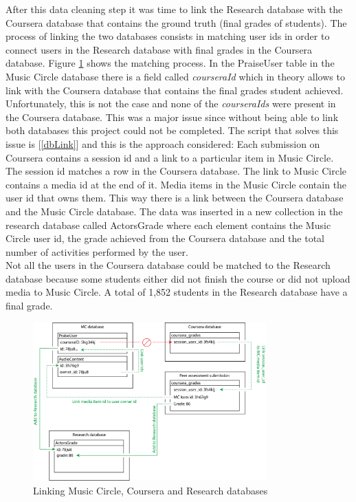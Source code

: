 \documentclass[11pt, oneside]{article}   	%
\begin{document}
After this data cleaning step it was time to link the Research database with the Coursera database that contains the ground truth (final grades of students). The process of linking the two databases consists in matching user ids in order to connect users in the Research database with final grades in the Coursera database. Figure \ref{figure:linkDatabases} shows the matching process. In the PraiseUser table in the Music Circle database there is a field called {\it courseraId} which in theory allows to link with the Coursera database that contains the final grades student achieved. Unfortunately, this is not the case and none of the {\it courseraIds} were present in the Coursera database. This was a major issue since without being able to link both databases this project could not be completed. The script that solves this issue is [\ref{dbLink}] and this is the approach considered: Each submission on Coursera contains a session id and a link to a particular item in Music Circle. The session id matches a row in the Coursera database. The link to Music Circle contains a media id at the end of it. Media items in the Music Circle contain the user id that owns them. This way there is a link between the Coursera database and the Music Circle database. The data was inserted in a new collection in the research database called ActorsGrade where each element contains the Music Circle user id, the grade achieved from the Coursera database and the total number of activities performed by the user.\\ 
Not all the users in the Coursera database could be matched to the Research database because some students either did not finish the course or did not upload media to Music Circle. A total of 1,852 students in the Research database have a final grade.
\clearpage
\begin{figure}[h!]
        \centering
   	\includegraphics[width=0.8\textwidth]{./dbLink.png}
    	\caption{Linking Music Circle, Coursera and Research databases}
	\label{figure:linkDatabases}
\end{figure}
\end{document}
